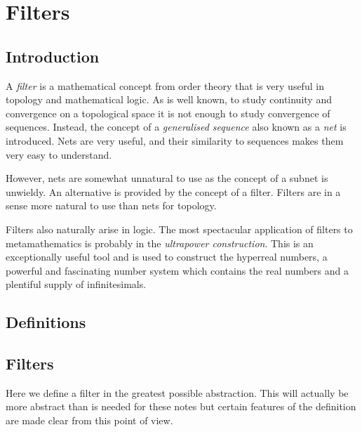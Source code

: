 
\section{Filters} %
\label{sec:filters}


\subsection{Introduction}
A \emph{filter} is a mathematical concept from order theory that is
very useful in topology and mathematical logic. As is well known, to study
continuity and convergence on a topological space
it is not enough to study convergence of sequences. Instead, the concept
of a \emph{generalised sequence} also known as a \emph{net} is introduced. Nets are
very useful, and their similarity to sequences makes them very easy to understand.

However, nets are somewhat unnatural to use as the concept of a subnet is unwieldy.
An alternative is provided by the concept of a filter. Filters are in a sense more natural
to use than nets for topology.

Filters also naturally arise in logic. The most spectacular
application of filters to metamathematics is probably in the \emph{ultrapower
construction}. This is an exceptionally useful tool and is used
to construct the hyperreal numbers, a powerful and fascinating number system
which contains the real numbers and a plentiful supply of infinitesimals.

\subsection{Definitions}
\subsection{Filters}
Here we define a filter in the greatest possible abstraction. This will
actually be more abstract than is needed for these notes but certain features
of the definition are made clear from this point of view.

